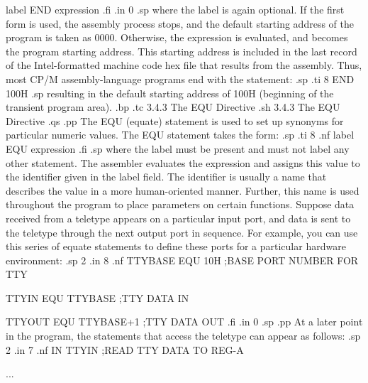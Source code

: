 label END expression
.fi
.in 0
.sp 
where the label is again optional.  If the first form is used, 
the assembly process stops, and the default starting address of 
the program is taken as 0000.  Otherwise, the expression is 
evaluated, and becomes the program starting address.  This 
starting address is included in the last record of the Intel-formatted 
machine code hex file that results from the 
assembly.  Thus, most CP/M assembly-language programs end with 
the statement:
.sp
.ti 8
END  100H
.sp
resulting in the default starting address of 100H (beginning of 
the transient program area).
.bp
.tc         3.4.3  The EQU Directive
.sh
3.4.3  The EQU Directive
.qs
.pp
The EQU (equate) statement is used to set up synonyms for 
particular numeric values.  The EQU statement takes the form:
.sp
.ti 8
.nf
label    EQU    expression
.fi
.sp
where the label must be present and must not label any other 
statement.  The assembler evaluates the expression and assigns 
this value to the identifier given in the label field.  The 
identifier is usually a name that describes the value in a more 
human-oriented manner.  Further, this name is used throughout the 
program to place parameters on certain functions.  Suppose data 
received from a teletype appears on a particular input port, and 
data is sent to the teletype through the next output port in 
sequence.  For example, you can use this series of equate statements 
to define these ports for a particular hardware environment:
.sp 2
.in 8
.nf
TTYBASE      EQU 10H         ;BASE PORT NUMBER FOR TTY

TTYIN        EQU TTYBASE     ;TTY DATA IN

TTYOUT       EQU TTYBASE+1   ;TTY DATA OUT
.fi
.in 0
.sp 
.pp
At a later point in the program, the statements that access the 
teletype can appear as follows:
.sp 2
.in 7
.nf
 IN     TTYIN     ;READ TTY DATA TO REG-A

 ...

